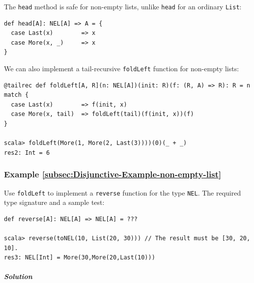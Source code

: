 The \lstinline!head! method is safe for non-empty lists, unlike \lstinline!head!
for an ordinary \lstinline!List!:
\begin{lstlisting}
def head[A]: NEL[A] => A = {
  case Last(x)        => x
  case More(x, _)     => x
}
\end{lstlisting}

We can also implement a tail-recursive \lstinline!foldLeft! function
for non-empty lists:
\begin{lstlisting}
@tailrec def foldLeft[A, R](n: NEL[A])(init: R)(f: (R, A) => R): R = n match {
  case Last(x)        => f(init, x)
  case More(x, tail)  => foldLeft(tail)(f(init, x))(f)
}

scala> foldLeft(More(1, More(2, Last(3))))(0)(_ + _)
res2: Int = 6
\end{lstlisting}


\subsubsection{Example \label{subsec:Disjunctive-Example-non-empty-list}\ref{subsec:Disjunctive-Example-non-empty-list}}

Use \lstinline!foldLeft! to implement a \lstinline!reverse! function
for the type \lstinline!NEL!. The required type signature and a sample
test:
\begin{lstlisting}
def reverse[A]: NEL[A] => NEL[A] = ???

scala> reverse(toNEL(10, List(20, 30))) // The result must be [30, 20, 10].
res3: NEL[Int] = More(30,More(20,Last(10)))
\end{lstlisting}


\subparagraph{Solution}

